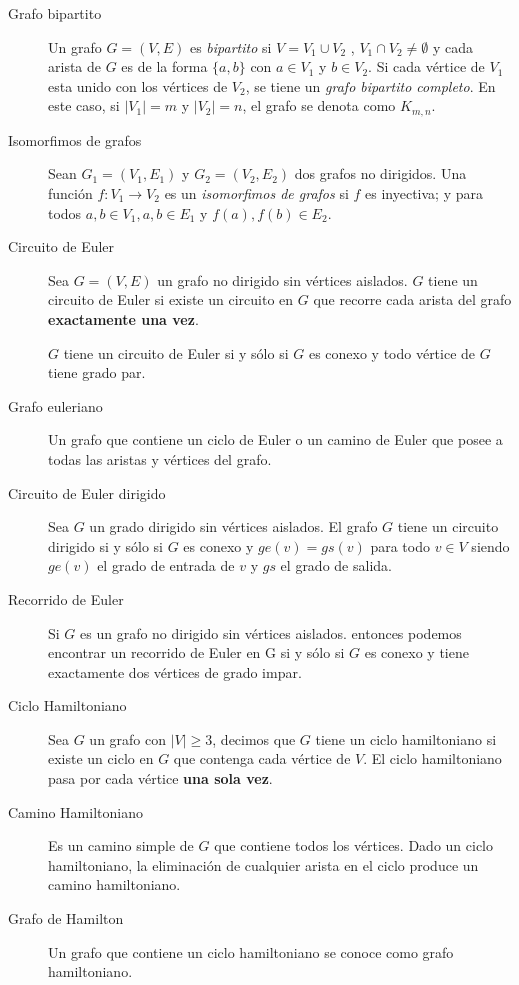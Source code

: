 \documentclass[a4paper, twoside]{article}
\begin{document}
\begin{description}
	\item[Grafo bipartito] Un grafo $G = (V,E)$ es \emph{bipartito} si $V = V_1 \cup V_2$
	, $V_1 \cap V_2 \neq \emptyset$ y cada arista de $G$ es de la forma $\{ a, b \}$ con 
	$a \in V_1$ y $b \in V_2$. Si cada vértice de $V_1$ esta unido con los 
	vértices de $V_2$, se tiene un \emph{grafo bipartito completo}.
	En este caso, si $|V_1| = m$ y $|V_2| = n$, el grafo se denota como $K_{m,n}$.

	\item[Isomorfimos de grafos] Sean $G_1 = (V_1, E_1)$ y $G_2 = (V_2, E_2)$
	dos grafos no dirigidos. Una función $f:V_1 \rightarrow V_2$ es un 
	\emph{isomorfimos de grafos} si $f$ es inyectiva; y para todos $a,b \in V_1,
	{a,b} \in E_1$ y ${f(a),f(b)} \in E_2$.

	\item[Circuito de Euler] Sea $G = (V,E)$ un grafo no dirigido sin vértices 
	aislados. $G$ tiene un circuito de Euler si existe un circuito en $G$ que 
	recorre cada arista del grafo \textbf{exactamente una vez}.
	
	$G$ tiene un circuito de Euler si y sólo si $G$ es conexo y todo vértice 
	de $G$ tiene grado par.

        \item [Grafo euleriano] Un grafo que contiene un ciclo de Euler o un camino
        de Euler que posee a todas las aristas y vértices del grafo.

        \item[Circuito de Euler dirigido] Sea $G$ un grado dirigido sin vértices aislados.
        El grafo $G$ tiene un circuito dirigido si y sólo si $G$ es conexo y $ge(v) = gs(v)$
        para todo $v \in V$ siendo $ge(v)$ el grado de entrada de $v$ y $gs$ el grado de salida. 

        \item[Recorrido de Euler] Si $G$ es un grafo no dirigido sin vértices aislados.
        entonces podemos encontrar un recorrido de Euler en G si y sólo si $G$ es conexo 
        y tiene exactamente dos vértices de grado impar.

        \item [Ciclo Hamiltoniano] Sea $G$ un grafo con $|V| \ge 3$, decimos que $G$ tiene
        un ciclo hamiltoniano si existe un ciclo en $G$ que contenga cada vértice de $V$.
        El ciclo hamiltoniano pasa por cada vértice \textbf{una sola vez}.

        \item [Camino Hamiltoniano] Es un camino simple de $G$ que contiene todos los vértices.
        Dado un ciclo hamiltoniano, la eliminación de cualquier arista en el ciclo produce un
        camino hamiltoniano.

        \item [Grafo de Hamilton] Un grafo que contiene un ciclo hamiltoniano se conoce como grafo hamiltoniano.

\end{description}
\end{document}
